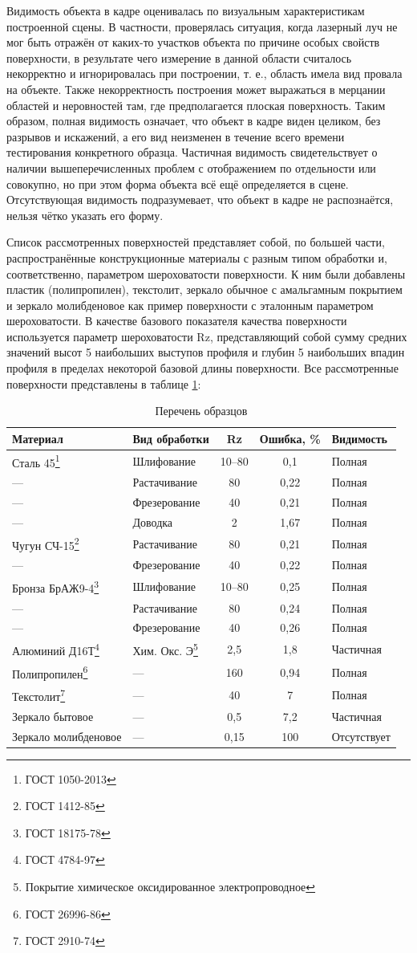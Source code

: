 Видимость объекта в кадре оценивалась по визуальным характеристикам построенной сцены. В частности, проверялась ситуация, когда лазерный луч не мог быть отражён от каких-то участков объекта по причине особых свойств поверхности, в результате чего измерение в данной области считалось некорректно и игнорировалась при построении, т. е., область имела вид провала на объекте. Также некорректность построения может выражаться в мерцании областей и неровностей там, где предполагается плоская поверхность. Таким образом, полная видимость означает, что объект в кадре виден целиком, без разрывов и искажений, а его вид неизменен в течение всего времени тестирования конкретного образца. Частичная видимость свидетельствует о наличии вышеперечисленных проблем с отображением по отдельности или совокупно, но при этом форма объекта всё ещё определяется в сцене. Отсутствующая видимость подразумевает, что объект в кадре не распознаётся, нельзя чётко указать его форму. 

Список рассмотренных поверхностей представляет собой, по большей части, распространённые конструкционные материалы с разным типом обработки и, соответственно, параметром шероховатости поверхности. К ним были добавлены пластик (полипропилен), текстолит, зеркало обычное с амальгамным покрытием и зеркало молибденовое как пример поверхности с эталонным параметром шероховатости. В качестве базового показателя качества поверхности используется параметр шероховатости Rz, представляющий собой сумму средних значений высот 5 наибольших выступов профиля и глубин 5 наибольших впадин профиля в пределах некоторой базовой длины поверхности. Все рассмотренные поверхности представлены в таблице \cref{tab:tp2}:

\begingroup
\centering
\captionsetup[table]{skip=7pt} %
\begin{longtable}[c]{|p{5cm}|p{3.5cm}|c|c|p{3cm}|}
	\caption{Перечень образцов}\label{tab:tp2}
	\\[-0.45\onelineskip]
	\hline
	Материал & Вид обработки & Rz & Ошибка, \% & Видимость \tabularnewline \hline
	Сталь 45\footnote{ГОСТ 1050-2013} & Шлифование & 10--80 & 0,1 & Полная \tabularnewline \hline
	--- & Растачивание & 80 & 0,22 & Полная \tabularnewline \hline
	--- & Фрезерование & 40 & 0,21 & Полная \tabularnewline \hline
	--- & Доводка & 2 & 1,67 & Полная \tabularnewline \hline
	Чугун СЧ-15\footnote{ГОСТ 1412-85} & Растачивание & 80 & 0,21 & Полная \tabularnewline \hline
	--- & Фрезерование & 40 & 0,22 & Полная \tabularnewline \hline
	Бронза БрАЖ9-4\footnote{ГОСТ 18175-78} & Шлифование & 10--80 & 0,25 & Полная \tabularnewline \hline
	--- & Растачивание & 80 & 0,24 & Полная \tabularnewline \hline
	--- & Фрезерование & 40 & 0,26 & Полная \tabularnewline \hline
	Алюминий Д16Т\footnote{ГОСТ 4784-97} & Хим. Окс. Э\footnote{Покрытие химическое оксидированное электропроводное} & 2,5 & 1,8 & Частичная \tabularnewline \hline
	Полипропилен\footnote{ГОСТ 26996-86} & --- & 160 & 0,94 & Полная \tabularnewline \hline
	Текстолит\footnote{ГОСТ 2910-74} & --- & 40 & 7 & Полная \tabularnewline \hline
	Зеркало бытовое & --- & 0,5 & 7,2 & Частичная \tabularnewline \hline
	Зеркало молибденовое & --- & 0,15 & 100 & Отсутствует \tabularnewline \hline
\end{longtable}
\endgroup

